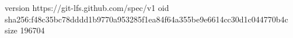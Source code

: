 version https://git-lfs.github.com/spec/v1
oid sha256:f48c35bc78dddd1b9770a953285f1ea84f64a355be9e6614cc30d1c044770b4c
size 196704
